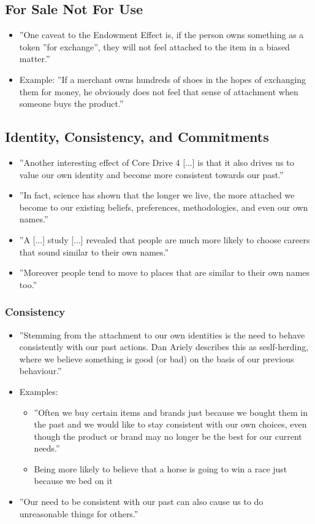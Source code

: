 \subsection{For Sale Not For Use}
\begin{itemize}
    \item ''One caveat to the Endowment Effect is, if the person owns something as a token ''for exchange'', they will not feel attached to the item in a biased matter.''
    \item Example: ''If a merchant owns hundreds of shoes in the hopes of exchanging them for money, he obviously does not feel that sense of attachment when someone buys the product.''
\end{itemize}

\subsection{Identity, Consistency, and Commitments}
\begin{itemize}
    \item ''Another interesting effect of Core Drive 4 [...] is that it also drives us to value our own identity and become more consistent towards our past.''
    \item ''In fact, science has shown that the longer we live, the more attached we become to our existing beliefs, preferences, methodologies, and even our own names.''
    \item ''A [...] study [...] revealed that people are much more likely to choose careers that sound similar to their own names.''
    \item ''Moreover people tend to move to places that are similar to their own names too.''
\end{itemize}

\subsubsection{Consistency}
\begin{itemize}
    \item ''Stemming from the attachment to our own identities is the need to behave consistently with our past actions. Dan Ariely describes this as seslf-herding, where we believe something is good (or bad) on the basis of our previous behaviour.''
    \item Examples: 
    \begin{itemize}
        \item ''Often we buy certain items and brands just because we bought them in the past and we would like to stay consistent with our own choices, even though the product or brand may no longer be the best for our current needs.''
        \item Being more likely to believe that a horse is going to win a race just because we bed on it
    \end{itemize}
    \item ''Our need to be consistent with our past can also cause us to do unreasonable things for others.''
\end{itemize}

